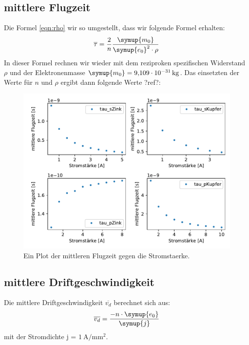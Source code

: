     \subsection{mittlere Flugzeit}

    
    Die Formel \ref{eqn:rho} wir so umgestellt, dass wir folgende Formel erhalten:
    \begin{equation}
        \overline{\tau} =\frac{2}{n}\frac{\symup{m_0}}{\symup{e_0}^2 \cdot \rho}
    \end{equation}
    In dieser Formel rechnen wir wieder mit dem reziproken spezifischen Widerstand $\rho$ und der Elektronenmasse
    $\symup{m_0} = \SI{9.109e-31}{\kilogram}$. Das einsetzten der Werte für $n$ und $\rho$ ergibt dann folgende Werte ?ref?:

    \begin{figure}[H]
        \centering
        \includegraphics[width=1.1\textwidth]{build/tau.pdf}
        \caption{Ein Plot der mittleren Flugzeit gegen die Stromstaerke.}
        \label{img:tau}
    \end{figure}


    \subsection{mittlere Driftgeschwindigkeit}


    Die mittlere Driftgeschwindigkeit $\overline{v_d}$ berechnet sich aus:
    \begin{equation}
        \overline{v_d} = \frac{-n \cdot \symup{e_0}}{\symup{j}}
    \end{equation}
    mit der Stromdichte j = $\SI{1}{\ampere\per\milli\meter\squared}$.

